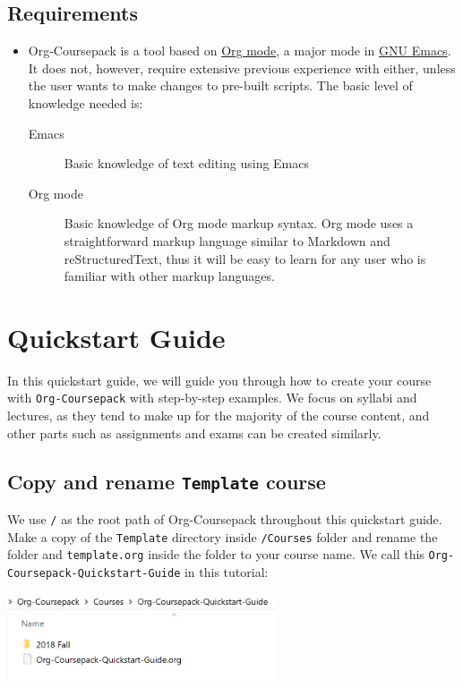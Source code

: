 \documentclass[10pt,article]{article}
\begin{document}
\subsection{Requirements}
\label{sec:org3808cae}
\begin{itemize}
\item Org-Coursepack is a tool based on \href{https://orgmode.org/manual/Export-settings.html}{Org mode}, a major mode in \href{https://www.gnu.org/software/emacs/manual/html\_node/emacs/Specifying-File-Variables.html\#Specifying-File-Variables}{GNU Emacs}. It
does not, however, require extensive previous experience with either, unless
the user wants to make changes to pre-built scripts. The basic level of
knowledge needed is:
\begin{description}
\item[{Emacs}] Basic knowledge of text editing using Emacs
\item[{Org mode}] Basic knowledge of Org mode markup syntax. Org mode uses a
straightforward markup language similar to Markdown and
reStructuredText, thus it will be easy to learn for any user
who is familiar with other markup languages.
\end{description}
\end{itemize}
\section{Quickstart Guide}
\label{sec:org68b5d44}
In this quickstart guide, we will guide you through how to create your course
with \texttt{Org-Coursepack} with step-by-step examples. We focus on syllabi and lectures, 
as they tend to make up for the majority of the course content, and other parts such as 
assignments and exams can be created similarly.
\subsection{Copy and rename \texttt{Template} course}
\label{sec:orgbc82294}
We use \texttt{/} as the root path of Org-Coursepack throughout this quickstart
guide. Make a copy of the \texttt{Template} directory inside \texttt{/Courses} folder and
rename the folder and \texttt{template.org} inside the folder to your course name. We
call this \texttt{Org-Coursepack-Quickstart-Guide} in this tutorial:

\begin{center}
\includegraphics[width=8cm]{../../../Assets/Images/Org-Teaching/Quickstart_Course-renamed.png}
\end{center}
\end{document}
